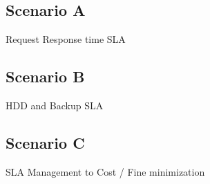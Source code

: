 \subsection{Scenario A}
Request Response time SLA


\subsection{Scenario B}
HDD and Backup SLA

\subsection{Scenario C}
SLA Management to Cost / Fine minimization
